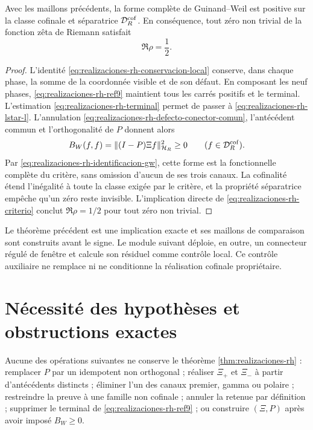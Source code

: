 \begin{theorem}
\label{thm:realizaciones-rh}
Avec les maillons précédents, la forme complète de Guinand--Weil est positive
sur la classe cofinale et séparatrice \(\mathcal D_R^{\rm cof}\). En conséquence,
tout zéro non trivial de la fonction zêta de Riemann satisfait
\[
 \Re\rho=\frac12.
\]
\end{theorem}

\begin{proof}
L'identité \eqref{eq:realizaciones-rh-conservacion-local} conserve, dans
chaque phase, la somme de la coordonnée visible et de son défaut. En composant les
neuf phases, \eqref{eq:realizaciones-rh-ref9} maintient tous les carrés
positifs et le terminal. L'estimation
\eqref{eq:realizaciones-rh-terminal} permet de passer à
\eqref{eq:realizaciones-rh-lstar-l}. L'annulation
\eqref{eq:realizaciones-rh-defecto-conector-comun}, l'antécédent commun et
l'orthogonalité de \(P\) donnent alors
\[
 B_W(f,f)=\|(I-P)\Xi f\|_{\mathcal H_R}^{2}\geq0
 \qquad(f\in\mathcal D_R^{\rm cof}).
\]
Par \eqref{eq:realizaciones-rh-identificacion-gw}, cette forme est la
fonctionnelle complète du critère, sans omission d'aucun de ses trois canaux. La
cofinalité étend l'inégalité à toute la classe exigée par le critère,
et la propriété séparatrice empêche qu'un zéro reste invisible. L'implication
directe de \eqref{eq:realizaciones-rh-criterio} conclut
\(\Re\rho=1/2\) pour tout zéro non trivial.
\end{proof}

Le théorème précédent est une implication exacte et ses maillons de
comparaison sont construits avant le signe. Le module suivant déploie,
en outre, un connecteur régulé de fenêtre et calcule son résiduel comme contrôle
local. Ce contrôle auxiliaire ne remplace ni ne conditionne la réalisation
cofinale propriétaire.



\section*{Nécessité des hypothèses et obstructions exactes}

\begin{ablation}
\label{abl:realizaciones-rh}
Aucune des opérations suivantes ne conserve le théorème
\ref{thm:realizaciones-rh} : remplacer \(P\) par un idempotent non
orthogonal ; réaliser \(\Xi_+\) et \(\Xi_-\) à partir d'antécédents distincts ;
éliminer l'un des canaux premier, gamma ou polaire ; restreindre la preuve à une
famille non cofinale ; annuler la retenue par définition ; supprimer le terminal de
\eqref{eq:realizaciones-rh-ref9} ; ou construire \((\Xi,P)\) après avoir imposé
\(B_W\geq0\).
\end{ablation}

